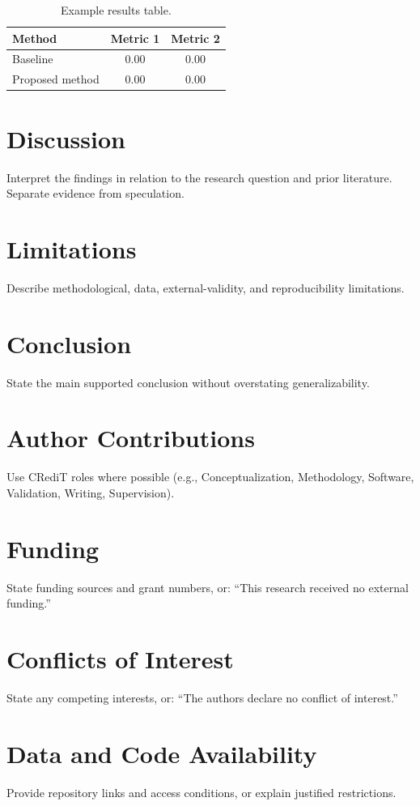 \documentclass[11pt,a4paper]{article}
\begin{document}
\begin{table}[ht]
\centering
\caption{Example results table.}
\begin{tabular}{lcc}
\toprule
Method & Metric 1 & Metric 2 \\
\midrule
Baseline & 0.00 & 0.00 \\
Proposed method & 0.00 & 0.00 \\
\bottomrule
\end{tabular}
\end{table}

\section{Discussion}
Interpret the findings in relation to the research question and prior literature. Separate evidence from speculation.

\section{Limitations}
Describe methodological, data, external-validity, and reproducibility limitations.

\section{Conclusion}
State the main supported conclusion without overstating generalizability.

\section*{Author Contributions}
Use CRediT roles where possible (e.g., Conceptualization, Methodology, Software, Validation, Writing, Supervision).

\section*{Funding}
State funding sources and grant numbers, or: ``This research received no external funding.''

\section*{Conflicts of Interest}
State any competing interests, or: ``The authors declare no conflict of interest.''

\section*{Data and Code Availability}
Provide repository links and access conditions, or explain justified restrictions.
\end{document}
